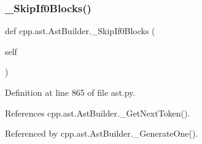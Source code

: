 \subsubsection{\texorpdfstring{\+\_\+\+Skip\+If0\+Blocks()}{\_SkipIf0Blocks()}}
{\footnotesize\ttfamily def cpp.\+ast.\+Ast\+Builder.\+\_\+\+Skip\+If0\+Blocks (\begin{DoxyParamCaption}\item[{}]{self }\end{DoxyParamCaption})\hspace{0.3cm}{\ttfamily [private]}}



Definition at line 865 of file ast.\+py.



References cpp.\+ast.\+Ast\+Builder.\+\_\+\+Get\+Next\+Token().



Referenced by cpp.\+ast.\+Ast\+Builder.\+\_\+\+Generate\+One().


